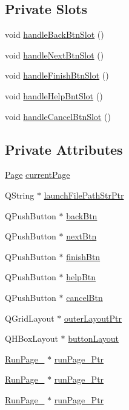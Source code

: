 \subsection*{Private Slots}
\begin{DoxyCompactItemize}
\item 
void \hyperlink{class_run_gui_abe8773e053b15ed96efcdb6e4b63e508}{handle\-Back\-Btn\-Slot} ()
\item 
void \hyperlink{class_run_gui_a267f472d21d57258adb28ebdcc83b256}{handle\-Next\-Btn\-Slot} ()
\item 
void \hyperlink{class_run_gui_a011495c9158d92b794941ac108b5b148}{handle\-Finish\-Btn\-Slot} ()
\item 
void \hyperlink{class_run_gui_ab29bf8394f8b23b2c1ffd33c6d2470eb}{handle\-Help\-Bnt\-Slot} ()
\item 
void \hyperlink{class_run_gui_a1127986fbf076ce480defe68d99171e1}{handle\-Cancel\-Btn\-Slot} ()
\end{DoxyCompactItemize}
\subsection*{Private Attributes}
\begin{DoxyCompactItemize}
\item 
\hyperlink{class_run_gui_acb4a3da6e31619ee4b0ac8c8f9cb64a3}{Page} \hyperlink{class_run_gui_a1d93e84df8a71767ca927554e5b0fe0d}{current\-Page}
\item 
Q\-String $\ast$ \hyperlink{class_run_gui_a3766ac7d4bfae38eb0d9f535f0d9bcf5}{launch\-File\-Path\-Str\-Ptr}
\item 
Q\-Push\-Button $\ast$ \hyperlink{class_run_gui_a5a79c5d8f3a61510c2be51738e428473}{back\-Btn}
\item 
Q\-Push\-Button $\ast$ \hyperlink{class_run_gui_a02bb63cd6c6d77933f98087111ce1a66}{next\-Btn}
\item 
Q\-Push\-Button $\ast$ \hyperlink{class_run_gui_a2989fde08a236488c152c8fa584c3380}{finish\-Btn}
\item 
Q\-Push\-Button $\ast$ \hyperlink{class_run_gui_a6c0a17f55049da888442fbc28dff7a78}{help\-Btn}
\item 
Q\-Push\-Button $\ast$ \hyperlink{class_run_gui_aa14d8877052e9cc11c93055561501792}{cancel\-Btn}
\item 
Q\-Grid\-Layout $\ast$ \hyperlink{class_run_gui_ae4cdc2ec0797c9121a47b9cdf3b93115}{outer\-Layout\-Ptr}
\item 
Q\-H\-Box\-Layout $\ast$ \hyperlink{class_run_gui_a812f0836d9eb5b0148cf92b61bc53be2}{button\-Layout}
\item 
\hyperlink{class_run_page__1}{Run\-Page\-\_} $\ast$ \hyperlink{class_run_gui_aa52f64156c00bbd4e14c46b8113e3072}{run\-Page\-\_\-Ptr}
\item 
\hyperlink{class_run_page__2}{Run\-Page\-\_} $\ast$ \hyperlink{class_run_gui_a86764c1a0c9629fbce62c7cb13c5ee07}{run\-Page\-\_\-Ptr}
\item 
\hyperlink{class_run_page__3}{Run\-Page\-\_} $\ast$ \hyperlink{class_run_gui_a7306b4df6c8619a98da052935a021cf8}{run\-Page\-\_\-Ptr}
\end{DoxyCompactItemize}


